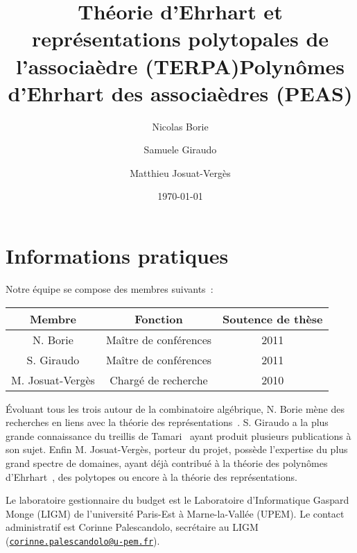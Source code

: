\documentclass[a4paper, 10pt]{article}
\title{Théorie d'Ehrhart et représentations polytopales de
l'associaèdre (TERPA)} %
\title{{\bf P}olynômes d'{\bf E}hrhart des {\bf a}ssociaèdre{\bf s}
(PEAS)}
\date{\today}
\author{Nicolas Borie \and Samuele Giraudo \and Matthieu Josuat-Verg\`es}
\numberwithin{equation}{subsection}
\begin{document}
\maketitle
\vspace{-1cm}

\section*{\center Informations pratiques}
Notre équipe se compose des membres suivants~:
\begin{center}
\begin{tabular}{|c|c|c|} \hline
    {\bf Membre} & {\bf Fonction} & {\bf Soutence de thèse}
        \\ \hline \hline
    N. Borie & Maître de conférences & 2011 \\ \hline
    S. Giraudo & Maître de conférences & 2011 \\ \hline
    M. Josuat-Vergès & Chargé de recherche & 2010 \\ \hline
\end{tabular}
\end{center}
\smallbreak

Évoluant tous les trois autour de la combinatoire algébrique, N. Borie
mène des recherches en liens avec la théorie des
représentations~\cite{Bor15}. S. Giraudo a la plus grande connaissance
du treillis de Tamari~\cite{Gir12} ayant produit plusieurs publications
à son sujet. Enfin M. Josuat-Vergès, porteur du projet, possède
l'expertise du plus grand spectre de domaines, ayant déjà contribué à la
théorie des polynômes d'Ehrhart~\cite{HJV16}, des polytopes ou encore à
la théorie des représentations.
\smallbreak

Le laboratoire gestionnaire du budget est le Laboratoire d'Informatique
Gaspard Monge (LIGM) de l'université Paris-Est à Marne-la-Vallée (UPEM).
Le contact administratif est Corinne Palescandolo, secrétaire au LIGM
(\href{mailto:corinne.palescandolo@u-pem.fr}
{\tt corinne.palescandolo@u-pem.fr}).
\smallbreak

\vspace{-1cm}

\end{document}
